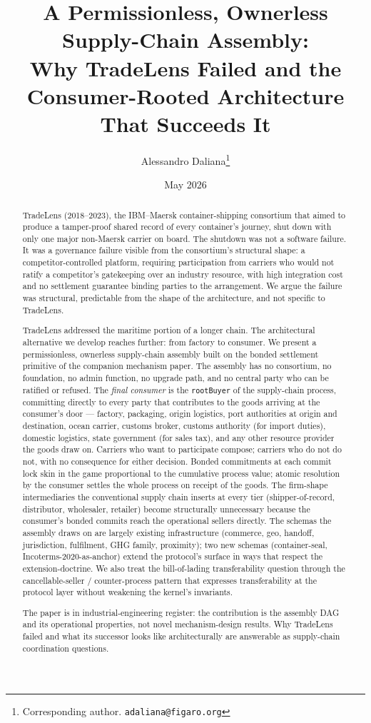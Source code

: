 \documentclass[11pt,a4paper]{article}
\title{%
  A Permissionless, Ownerless Supply-Chain Assembly:\\
  Why TradeLens Failed and the Consumer-Rooted Architecture That Succeeds It%
}
\author{
  Alessandro Daliana\thanks{Corresponding author. \texttt{adaliana@figaro.org}}
}
\date{May 2026}
\theoremstyle{definition}
\theoremstyle{remark}
\begin{document}
\maketitle

\begin{abstract}
TradeLens (2018--2023), the IBM--Maersk container-shipping consortium
that aimed to produce a tamper-proof shared record of every container's
journey, shut down with only one major non-Maersk carrier on board. The
shutdown was not a software failure. It was a governance failure
visible from the consortium's structural shape: a competitor-controlled
platform, requiring participation from carriers who would not ratify a
competitor's gatekeeping over an industry resource, with high
integration cost and no settlement guarantee binding parties to the
arrangement. We argue the failure was structural, predictable from the
shape of the architecture, and not specific to TradeLens.

TradeLens addressed the maritime portion of a longer chain. The
architectural alternative we develop reaches further: from factory
to consumer. We present a permissionless, ownerless supply-chain
assembly built on the bonded settlement primitive of the companion
mechanism paper. The assembly has no consortium, no foundation, no
admin function, no upgrade path, and no central party who can be
ratified or refused. The \emph{final consumer} is the
\texttt{rootBuyer} of the supply-chain process, committing directly
to every party that contributes to the goods arriving at the
consumer's door --- factory, packaging, origin logistics, port
authorities at origin and destination, ocean carrier, customs
broker, customs authority (for import duties), domestic logistics,
state government (for sales tax), and any other resource provider
the goods draw on. Carriers who want to participate compose;
carriers who do not do not, with no consequence for either decision.
Bonded commitments at each commit lock skin in the game proportional
to the cumulative process value; atomic resolution by the consumer
settles the whole process on receipt of the goods. The firm-shape
intermediaries the conventional supply chain inserts at every tier
(shipper-of-record, distributor, wholesaler, retailer) become
structurally unnecessary because the consumer's bonded commits reach
the operational sellers directly.
The schemas the assembly draws on are largely existing infrastructure
(commerce, geo, handoff, jurisdiction, fulfilment, GHG family,
proximity); two new schemas (container-seal, Incoterms-2020-as-anchor)
extend the protocol's surface in ways that respect the
extension-doctrine. We also treat the bill-of-lading transferability
question through the cancellable-seller / counter-process pattern that
expresses transferability at the protocol layer without weakening the
kernel's invariants.

The paper is in industrial-engineering register: the contribution is
the assembly DAG and its operational properties, not novel
mechanism-design results. Why TradeLens failed and what its successor
looks like architecturally are answerable as supply-chain coordination
questions.
\end{abstract}
\end{document}

